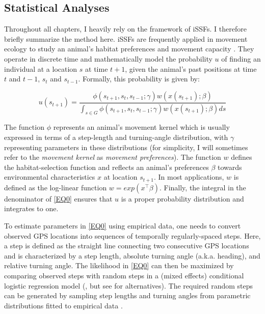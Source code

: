 \documentclass[../FinalThesis.tex]{subfiles}
\begin{document}
\subsection{Statistical Analyses}

Throughout all chapters, I heavily rely on the framework of iSSFs. I therefore
briefly summarize the method here. iSSFs are frequently applied in movement
ecology to study an animal's habitat preferences and movement capacity
\citep{Fortin.2005, Thurfjell.2014, Avgar.2016}. They operate in discrete time
and mathematically model the probability $u$ of finding an individual at a
location $s$ at time $t+1$, given the animal's past positions at time $t$ and
$t-1$, $s_t$ and $s_{t-1}$. Formally, this probability is given by:

\begin{equation}
\label{EQ0}
u(s_{t+1}) = \frac{\phi(s_{t+1}, s_t, s_{t-1}; \gamma)w(x(s_{t+1}); \beta)}{\int_{s \in G}\phi(s_{t+1}, s_{t}, s_{t-1}; \gamma)w(x(s_{t+1}); \beta)ds}
\end{equation}

\noindent The function $\phi$ represents an animal's movement kernel which is
usually expressed in terms of a step-length and turning-angle distribution, with
$\gamma$ representing parameters in these distributions (for simplicity, I will
sometimes refer to the \textit{movement kernel} as \textit{movement
preferences}). The function $w$ defines the habitat-selection function and
reflects an animal's preferences $\beta$ towards environmental characteristics
$x$ at location $s_{t+1}$. In most applications, $w$ is defined as the
log-linear function $w = exp(x^\top\beta)$. Finally, the integral in the
denominator of \ref{EQ0} ensures that $u$ is a proper probability distribution
and integrates to one.

To estimate parameters in \ref{EQ0} using empirical data, one needs to convert
observed GPS locations into sequences of temporally regularly-spaced steps.
Here, a step is defined as the straight line connecting two consecutive GPS
locations \citep{Turchin.1998} and is characterized by a step length, absolute
turning angle (a.k.a. heading), and relative turning angle. The likelihood in
\ref{EQ0} can then be maximized by comparing observed steps with random steps in
a (mixed effects) conditional logistic regression model (\citealp{Fortin.2005,
Muff.2020}, but see \citealp{Michelot.2016} for alternatives). The required
random steps can be generated by sampling step lengths and turning angles from
parametric distributions fitted to empirical data \citep{Fortin.2005,
Thurfjell.2014}.
\end{document}
